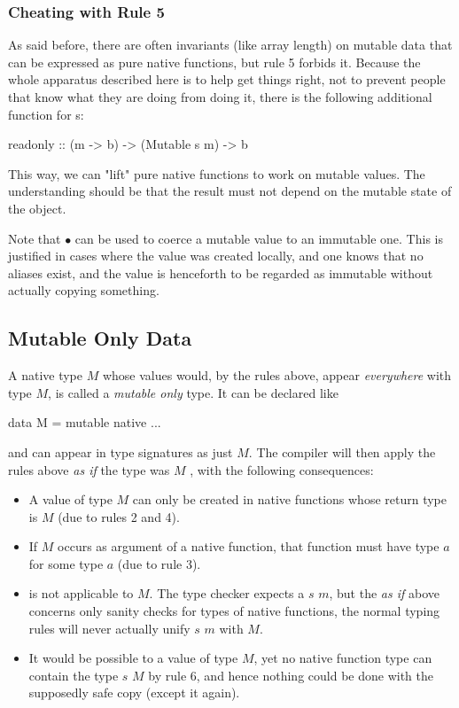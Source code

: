 \subsubsection{Cheating with Rule 5}

As said before, there are often invariants (like array length) on mutable data that can be expressed as pure native functions, but rule 5 forbids it. Because the whole apparatus described here is to help get things right, not to prevent people that know what they are doing from doing it, there is the following additional function for s:

\begin{code}
readonly :: (m -> b) -> (Mutable s m) -> b
\end{code}

This way, we can "lift" pure native functions to work on mutable values. The understanding should be that the result must not depend on the mutable state of the object.

Note that  $\bullet{}$   can be used to coerce a mutable value to an immutable one. This is justified in cases where the value was created locally, and one knows that no aliases exist, and the value is henceforth to be regarded as immutable without actually copying something.

\subsection{Mutable Only Data} \label{mutableonly}

A native type $M$ whose values would, by the rules above, appear \emph{everywhere} with type  $M$, is called a \emph{mutable only} type. It can be declared like

\begin{code}
data M = mutable native ...
\end{code}

and can appear in type signatures as just $M$. The compiler will then apply the rules above \emph{as if} the type was  $M$ , with the following consequences:

\begin{itemize}
\item A value of type $M$ can only be created in native functions whose return type is  $M$ (due to rules 2 and 4).
\item If $M$ occurs as argument of a native function, that function must have type  $a$ for some type $a$ (due to rule 3).
\item {} is not applicable to $M$. The type checker expects a  $s$ $m$, but the \emph{as if} above concerns only sanity checks for types of native functions, the normal typing rules will never actually unify  $s$ $m$ with $M$.
\item It would be possible to  a value of type $M$, yet no native function type can contain the type  $s$ $M$ by rule 6, and hence nothing could be done with the supposedly safe copy (except  it again).
\end{itemize}

